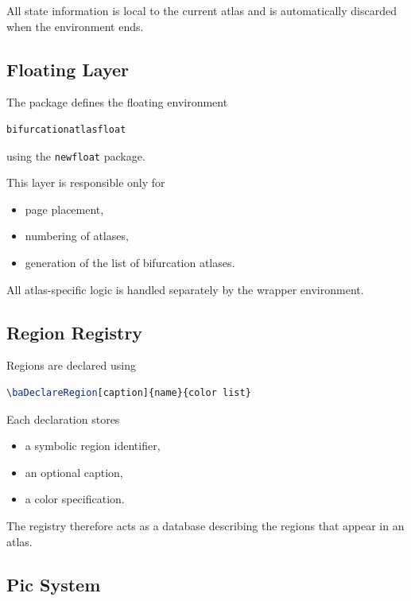 All state information is local to the current atlas and is automatically discarded when the environment ends.

\subsection{Floating Layer}

The package defines the floating environment

\begin{lstlisting}[language=LaTeX]
bifurcationatlasfloat
\end{lstlisting}

using the \texttt{newfloat} package.

This layer is responsible only for

\begin{itemize}
\item page placement,
\item numbering of atlases,
\item generation of the list of bifurcation atlases.
\end{itemize}

All atlas-specific logic is handled separately by the wrapper environment.

\subsection{Region Registry}

Regions are declared using

\begin{lstlisting}[language=LaTeX]
\baDeclareRegion[caption]{name}{color list}
\end{lstlisting}

Each declaration stores

\begin{itemize}
\item a symbolic region identifier,
\item an optional caption,
\item a color specification.
\end{itemize}

The registry therefore acts as a database describing the regions that appear in an atlas.

\subsection{Pic System}


